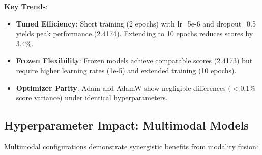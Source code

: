 \noindent \textbf{Key Trends}:
\begin{itemize}
    \item \textbf{Tuned Efficiency}: Short training (2 epochs) with lr=5e-6 and dropout=0.5 yields peak performance (2.4174). Extending to 10 epochs reduces scores by 3.4\%.
    \item \textbf{Frozen Flexibility}: Frozen models achieve comparable scores (2.4173) but require higher learning rates (1e-5) and extended training (10 epochs).
    \item \textbf{Optimizer Parity}: Adam and AdamW show negligible differences ($<0.1\%$ score variance) under identical hyperparameters.
\end{itemize}

\subsection{Hyperparameter Impact: Multimodal Models}
\label{subsec:multimodal-hparams}

Multimodal configurations demonstrate synergistic benefits from modality fusion:

